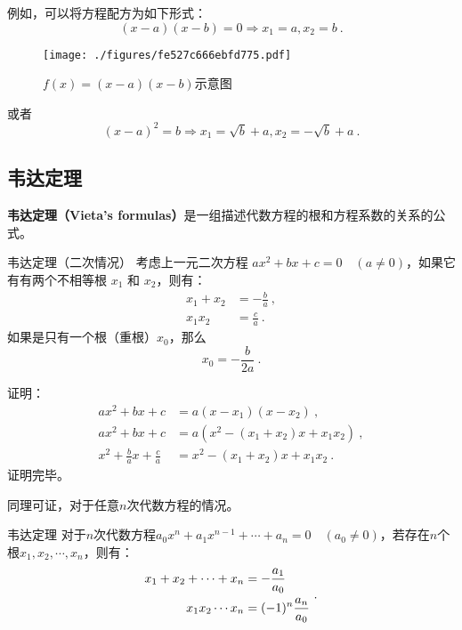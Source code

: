 例如，可以将方程配方为如下形式：
$$(x-a)(x-b)=0\Rightarrow x_1=a, x_2=b~.$$
\begin{figure}[ht]
\centering
\texttt{[image: ./figures/fe527c666ebfd775.pdf]}
\caption{$f(x)=(x-a)(x-b)$示意图} \label{fig_quasol_2}
\end{figure}
或者
$$(x-a)^2=b\Rightarrow x_1=\sqrt{b}+a, x_2=-\sqrt{b}+a~.$$

\subsection{韦达定理}

\textbf{韦达定理（Vieta's formulas）}是一组描述代数方程的根和方程系数的关系的公式。

\begin{theorem}{韦达定理（二次情况）}
考虑上一元二次方程 $a x^2 + b x + c = 0\quad(a \neq 0)$，如果它有有两个不相等根 $x_1$ 和 $x_2$，则有：
$$\begin{aligned}
x_1 + x_2 &= -\frac{b}{a} ~,\\
x_1 x_2 &= \frac{c}{a}~.
\end{aligned}$$
如果是只有一个根（重根）$x_0$，那么
$$
x_0 = - \frac{b}{2 a}~.
$$
\end{theorem}

证明：
$$\begin{aligned}
a x^2 + b x + c &= a (x - x_1) (x - x_2) ~,\\
a x^2 + b x + c &= a (x^2 - (x_1 + x_2) x + x_1 x_2)~, \\
x^2 + \frac{b}{a} x + \frac{c}{a} &=  x^2 - (x_1 + x_2) x + x_1 x_2~.
\end{aligned}$$
证明完毕。

同理可证，对于任意$n$次代数方程的情况。
\begin{theorem}{韦达定理}
对于$n$次代数方程$a_0x^n+a_1x^{n-1}+\cdots+a_n=0\quad(a_0\neq0)$，若存在$n$个根$x_1,x_2,\cdots,x_n$，则有：
\begin{equation}
\begin{split}
x_1+x_2+\cdots +x_n&=-{a_1\over a_0}\\
x_1x_2\cdots x_n&=(-1)^n{a_n\over a_0}
\end{split}~.
\end{equation}
\end{theorem}

